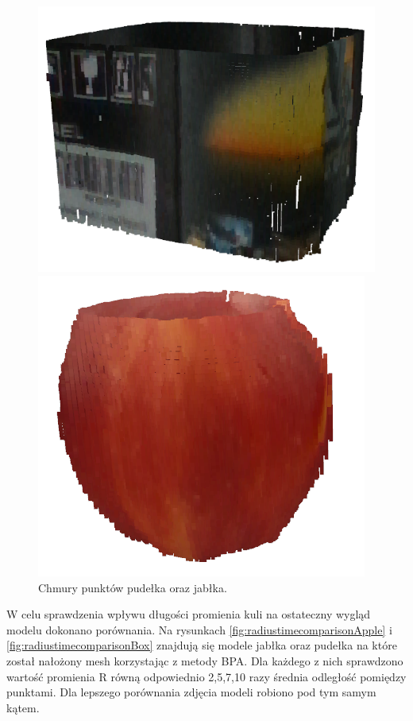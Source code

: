 \begin{figure}[H]
\centering
    \begin{minipage}[b]{0.45\linewidth}
        \includegraphics[scale=0.6]{pudelkoPointcloud.PNG}
    \end{minipage}
\quad
    \begin{minipage}[b]{0.45\linewidth}
        \includegraphics[scale=0.6]{jablkoPointcloud.PNG}

    \end{minipage}
\caption{Chmury punktów pudełka oraz jabłka.}
\label{fig:pointCloudFig}
\end{figure}

W celu sprawdzenia wpływu długości promienia kuli na ostateczny wygląd modelu dokonano porównania. Na rysunkach \ref{fig:radiustimecomparisonApple} i \ref{fig:radiustimecomparisonBox} znajdują się modele jabłka oraz pudełka na które został nałożony mesh korzystając z metody BPA. Dla każdego z nich sprawdzono wartość promienia R równą odpowiednio 2,5,7,10 razy średnia odległość pomiędzy punktami. Dla lepszego porównania zdjęcia modeli robiono pod tym samym kątem.


